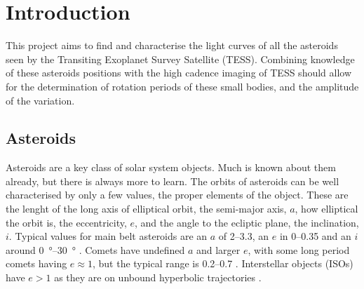 \documentclass{UCreport}
\begin{document}
\toc %

\listoffigures
\newpage
{}
\listoftables
\newpage


\section{Introduction}\label{Sec:Intro}

This project aims to find and characterise the light curves of all the asteroids seen by the Transiting Exoplanet Survey Satellite (TESS).
Combining knowledge of these asteroids positions with the high cadence imaging of TESS should allow for the determination of rotation periods of these small bodies, and the amplitude of the variation.


\subsection{Asteroids}\label{SubSec:Asteroid}

Asteroids are a key class of solar system objects. Much is known about them already, but there is always more to learn. 
The orbits of asteroids can be well characterised by only a few values, the proper elements of the object.
These are the lenght of the long axis of elliptical orbit, the semi-major axis, $a$, how elliptical the orbit is, the eccentricity, $e$, and the angle to the ecliptic plane, the inclination,$i$. 
Typical values for main belt asteroids are an $a$ of \qtyrange{2}{3.3}{\au}, an $e$ in \qtyrange{0}{0.35}{} and an $i$ around \qtyrange{0}{30}{\degree} \citep{DeMeo2015}.
Comets have undefined $a$ and larger $e$, with some long period comets having $e\approx 1$, but the typical range is \qtyrange{0.2}{0.7}{} \citep{Lewis2012}.
Interstellar objects (ISOs) have $e>1$ as they are on unbound hyperbolic trajectories \citep{McGlynn1989}.


\end{document}

